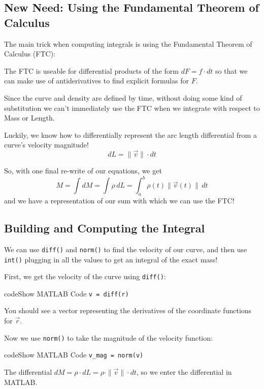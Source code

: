 \documentclass{ximera}
\begin{document}
\subsection*{New Need: Using the Fundamental Theorem of Calculus}

The main trick when computing integrals is using the Fundamental Theorem of Calculus (FTC):

The FTC is useable for differential products of the form $dF = f \cdot dt$ so that we can make use of antiderivatives to find explicit formulas for $F$.

Since the curve and density are defined by time, without doing some kind of substitution we can't immediately use the FTC when we integrate with respect to Mass or Length.

Luckily, we know how to differentially represent the arc length differential from a curve's velocity magnitude!
\[
dL = \|\vec{v}\| \cdot dt
\]

So, with one final re-write of our equations, we get
\[
M = \int dM = \int \rho \, dL = \int_a^b \rho(t) \|\vec{v}(t)\| \, dt
\]
and we have a representation of our sum with which we can use the FTC!

\subsection*{Building and Computing the Integral}

We can use \texttt{diff()} and \texttt{norm()} to find the velocity of our curve, and then use \texttt{int()} plugging in all the values to get an integral of the exact mass!

First, we get the velocity of the curve using \texttt{diff()}:

\begin{expandable}{code}{Show MATLAB Code}
\texttt{v = diff(r)}
\end{expandable}

You should see a vector representing the derivatives of the coordinate functions for $\vec{r}$.

Now we use \texttt{norm()} to take the magnitude of the velocity function:

\begin{expandable}{code}{Show MATLAB Code}
\texttt{v\_mag = norm(v)}
\end{expandable}

The differential $dM = \rho \cdot dL = \rho \cdot \|\vec{v}\| \cdot dt$, so we enter the differential in MATLAB.
\end{document}
